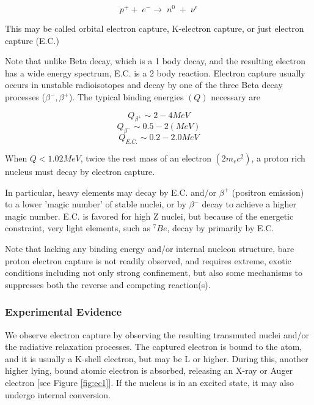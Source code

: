 \documentclass[%
 aip,
 jmp,%
 amsmath,amssymb,
 reprint,%
]{revtex4-1}
\begin{document}
$$p^{+}+\;e^{-}\rightarrow\;n^{0}\;+\;\nu^{e}$$

This may be called orbital electron capture, K-electron capture, or just electron capture (E.C.) 

Note that unlike Beta decay, which is a 1 body decay, and the resulting electron has a wide energy spectrum, E.C. is a 2 body reaction. Electron capture usually occurs in unstable radioisotopes and decay by one of the three Beta decay processes ($\beta^{-}, \beta^{+}$). The typical binding energies $(Q)$ necessary are 

$$Q_{\beta^{+}}\sim2-4{MeV}$$
$$Q_{\beta^{-}}\sim0.5-2(MeV)$$
$$Q_{E.C.}\sim0.2-2.0{MeV}$$

When $Q<1.02{MeV}$, twice the rest mass of an electron $(2m_{e}c^{2})$, a proton rich nucleus must decay by electron capture.

In particular, heavy elements may decay by E.C. and/or $\beta^{+}$ (positron emission) to a lower 'magic number' of stable nuclei, or by $\beta^{-}$ decay to achieve a higher magic number. E.C. is favored for high Z nuclei, but because of the energetic constraint, very light elements, such as $^{7}Be$, decay by primarily by E.C.    

Note that lacking any binding energy and/or internal nucleon structure, bare proton electron capture is not readily observed, and requires extreme, exotic conditions including not only strong confinement, but also some mechanisms to suppresses both the reverse and competing reaction(s). 

\subsubsection{Experimental Evidence}

We observe electron capture by observing the resulting transmuted nuclei and/or the radiative relaxation processes.  The captured electron is bound to the atom, and it is usually a K-shell electron, but may be L or higher.  During this, another higher lying, bound atomic electron is absorbed, releasing an X-ray or Auger electron [see Figure \ref{fig:ec1}].  If the nucleus is in an excited state, it may also  undergo internal conversion.  
\end{document}
